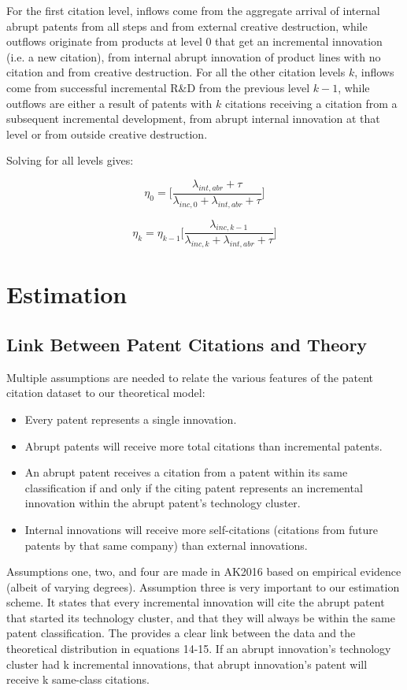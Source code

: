 \documentclass[letterpaper,12pt]{article}
\theoremstyle{definition}
\begin{document}
For the first citation level, inflows come from the aggregate arrival of internal abrupt patents from all steps and from external creative destruction, while outflows originate from products at level 0 that get an incremental innovation (i.e. a new citation), from internal abrupt innovation of product lines with no citation and from creative destruction. For all the other citation levels $k$, inflows come from successful incremental R\&D from the previous level $k-1$, while outflows are either a result of patents with $k$ citations receiving a citation from a subsequent incremental development, from abrupt internal innovation at that level or from outside creative destruction.

Solving for all levels gives:

\begin{equation} \label{eq:eta0}
\eta_0 = \Big[\frac{\lambda_{int,abr} + \tau}{\lambda_{inc,0} +\lambda_{int,abr} + \tau}\Big]
\end{equation}

\begin{equation} \label{eq:etak}
\eta_k = \eta_{k-1}\Big[\frac{\lambda_{inc,k-1}}{\lambda_{inc,k} +\lambda_{int,abr} + \tau}\Big]
\end{equation}

\section{Estimation}\label{sec:Estimation}

\subsection{Link Between Patent Citations and Theory}
Multiple assumptions are needed to relate the various features of the patent citation dataset to our theoretical model:
\begin{itemize}
	\item Every patent represents a single innovation.
	\item Abrupt patents will receive more total citations than incremental patents.
	\item An abrupt patent receives a citation from a patent within its same classification if and only if the citing patent represents an incremental innovation within the abrupt patent’s technology cluster.
	\item Internal innovations will receive more self-citations (citations from future patents by that same company) than external innovations.
\end{itemize}
Assumptions one, two, and four are made in AK2016 based on empirical evidence (albeit of varying degrees). Assumption three is very important to our estimation scheme. It states that every incremental innovation will cite the abrupt patent that started its technology cluster, and that they will always be within the same patent classification. The provides a clear link between the data and the theoretical distribution in equations 14-15. If an abrupt innovation’s technology cluster had k incremental innovations, that abrupt innovation’s patent will receive k same-class citations.
\end{document}
